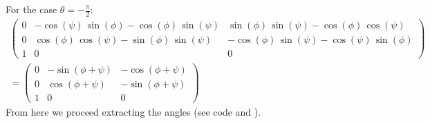 \documentclass[a4paper]{scrreprt}
\begin{document}
For the case $\theta=-\frac{\pi}{2}$: 
\begin{gather}
\left(\begin{array}{ccc} 
0 &  -\cos\left(\psi\right)\,\sin\left(\phi 
\right)-\cos\left(\phi 
\right)\,\sin\left(\psi\right) & \sin\left(\phi 
\right)\,\sin\left(\psi\right)-\cos\left(\phi 
\right)\,\cos\left(\psi\right)\\ 
0 &  \cos\left(\phi \right)\,\cos\left(\psi\right)-\sin\left(\phi 
\right)\,\sin\left(\psi\right) & -\cos\left(\phi 
\right)\,\sin\left(\psi\right)-\cos\left(\psi\right)\,\sin\left(\phi
\right)\\
1 &  	0 & 0 
\end{array}\right) \\
= 
\left(\begin{array}{ccc} 
0 &  -\sin(\phi+\psi) & -\cos(\phi+\psi) \\ 
0 &  \cos(\phi+\psi) & -\sin(\phi+\psi) \\
1 &  	0 & 0 
\end{array}\right)
\end{gather}
From here we proceed extracting the angles (see code and \cite{slabaugh1999computing}). 
\end{document}
